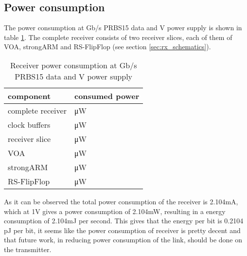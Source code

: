 \subsection{Power consumption}
The power consumption at \unit[10]{Gb/s} PRBS15 data and \unit[1]{V} power supply is shown in table \ref{tab:power_consumption}. The complete receiver consists of two receiver slices, each of them of VOA, strongARM and RS-FlipFlop (see section \ref{sec:rx_schematics}).

\begin{table}[H]
  \centering
  \begin{tabular}{l|l}
    component & consumed power\\
    \hline
    complete receiver & \unit[2104]{\uW}\\
    clock buffers & \unit[1814]{\uW}\\
    receiver slice & \unit[136,3]{\uW}\\
    VOA & \unit[32,58]{\uW}\\
    strongARM & \unit[46,07]{\uW}\\
    RS-FlipFlop & \unit[57,66]{\uW}\\
  \end{tabular}
  \caption{Receiver power consumption at \unit[10]{Gb/s} PRBS15 data and \unit[1]{V} power supply}
  \label{tab:power_consumption}
\end{table}

As it can be observed the total power consumption of the receiver is 2.104mA, which at 1V gives a power consumption of 2.104mW, resulting in a energy consumption of 2.104mJ per second. This gives that the energy per bit is 0.2104 pJ per bit, it seems like the power consumption of receiver is pretty decent and that future work, in reducing power consumption of the link, should be done on the transmitter.